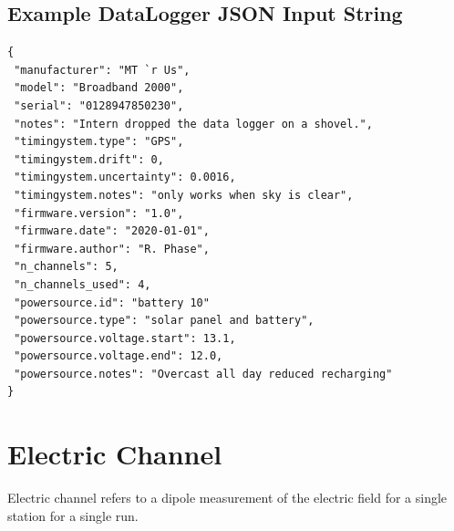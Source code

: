 \documentclass{article}
\begin{document}
\newpage
\subsection{Example DataLogger JSON Input String}

\begin{verbatim}
{
 "manufacturer": "MT `r Us",
 "model": "Broadband 2000",
 "serial": "0128947850230",
 "notes": "Intern dropped the data logger on a shovel.",
 "timingystem.type": "GPS",
 "timingystem.drift": 0,
 "timingystem.uncertainty": 0.0016,
 "timingystem.notes": "only works when sky is clear",
 "firmware.version": "1.0",
 "firmware.date": "2020-01-01",
 "firmware.author": "R. Phase",
 "n_channels": 5,
 "n_channels_used": 4,
 "powersource.id": "battery 10"
 "powersource.type": "solar panel and battery",
 "powersource.voltage.start": 13.1,
 "powersource.voltage.end": 12.0,
 "powersource.notes": "Overcast all day reduced recharging"
}
\end{verbatim}

\newpage
\section{Electric Channel}

Electric channel refers to a dipole measurement of the electric field for a single station for a single run.   
 
\end{document}
